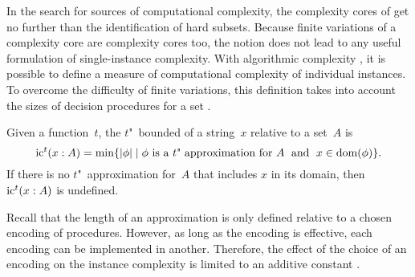 \label{sec:algorithmic}%

In the search for sources of computational complexity, the complexity cores of \citeauthor{lynch1975reducibility} get no further than the identification of hard subsets.
Because finite variations of a complexity core are complexity cores too, the notion does not lead to any useful formulation of single-instance complexity.
With algorithmic complexity \parencite{li2008introduction}, it is possible to define a measure of computational complexity of individual instances.
To overcome the difficulty of finite variations, this definition takes into account the sizes of decision procedures for a set \parencite{ko1986hard,orponen1994instance}.
\begin{definition}
  Given a function~$t$, the $t$"~bounded  of a string~$x$ relative to a set~$A$ is
  \begin{equation*}
    \operatorname{ic}^t(x : A) = \min\{{\lvert\phi\rvert} \;|\; \text{$\phi$ is a $t$"~approximation for $A$} \;\text{ and }\; x \in \operatorname{dom}(\phi)\}.
  \end{equation*}
  If there is no $t$"~approximation for~$A$ that includes $x$ in its domain, then $\operatorname{ic}^t(x : A)$ is undefined.
\end{definition}

Recall that the length of an approximation is only defined relative to a chosen encoding of procedures.
However, as long as the encoding is effective, each encoding can be implemented in another.
Therefore, the effect of the choice of an encoding on the instance complexity is limited to an additive constant \parencite{orponen1994instance,li2008introduction}.

